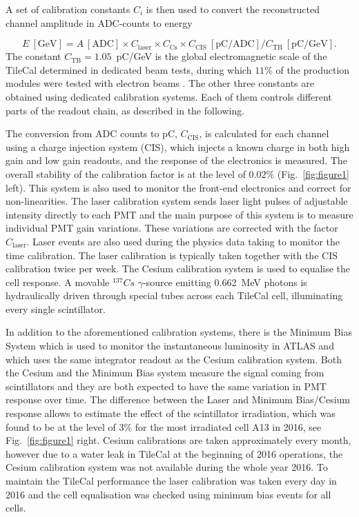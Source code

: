 \documentclass[10pt]{article}
\begin{document}
A set of calibration constants $C_i$ is then used to convert the reconstructed channel amplitude in ADC-counts to energy

\begin{equation}
      E~[\mathrm{GeV}] = A~[\mathrm{ADC}] \times C_\mathrm{laser} \times C_{\mathrm{Cs}} \times C_{\mathrm{CIS}}~[\mathrm{pC/ADC}] / C_{\mathrm{TB}}~[\mathrm{pC/GeV}].
      \label{eq:2}
\end{equation}
The constant $C_{\mathrm{TB}} = 1.05$~pC/GeV is the global electromagnetic scale of the TileCal determined in dedicated beam tests, during which $11\%$ of the production modules were tested with electron beams \cite{3}. The other three constants are obtained using dedicated calibration systems. Each of them controls different parts of the readout chain, as described in the following.

The conversion from ADC counts to pC, $C_{\mathrm{CIS}}$, is calculated for each channel using a charge injection system (CIS), which injects a known charge in both high gain and low gain readouts, and the response of the electronics is measured. The overall stability of the calibration factor is at the level of $0.02\%$ (Fig.~\ref{fig:figure1} left). This system is also used to monitor the front-end electronics and correct for non-linearities. The laser calibration system sends laser light pulses of adjustable intensity directly to each PMT and the main purpose of this system is to measure individual PMT gain variations. These variations are corrected with the factor $C_\mathrm{laser}$. Laser events are also used during the physics data taking to monitor the time calibration. The laser calibration is typically taken together with the CIS calibration twice per week. The Cesium calibration system is used to equalise the cell response. A movable $^{137}Cs$ $\gamma$-source emitting 0.662~MeV photons is hydraulically driven through special tubes across each TileCal cell, illuminating every single scintillator.

In addition to the aforementioned calibration systems, there is the Minimum Bias System which is used to monitor the instantaneous luminosity in ATLAS and which uses the same integrator readout as the Cesium calibration system. Both the Cesium and the Minimum Bias system measure the signal coming from scintillators and they are both expected to have the same variation in PMT response over time. The difference between the Laser and Minimum Bias/Cesium response allows to estimate the effect of the scintillator irradiation, which was found to be at the level of $3\%$ for the most irradiated cell A13 in 2016, see Fig.~\ref{fig:figure1} right. Cesium calibrations are taken approximately every month, however due to a water leak in TileCal at the beginning of 2016 operations, the Cesium calibration system was not available during the whole year 2016. 
To maintain the TileCal performance the laser calibration was taken every day in 2016 and the cell equalisation was checked using minimum bias events for all cells. 
\end{document}

